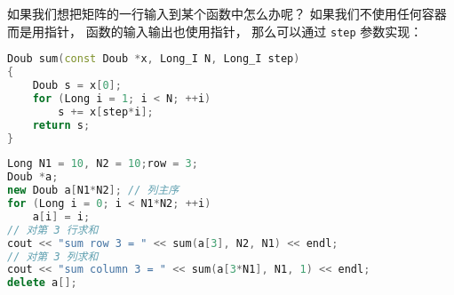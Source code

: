 
如果我们想把矩阵的一行输入到某个函数中怎么办呢？ 如果我们不使用任何容器而是用指针， 函数的输入输出也使用指针， 那么可以通过 \verb|step| 参数实现：
\begin{lstlisting}[language=cpp]
Doub sum(const Doub *x, Long_I N, Long_I step)
{
    Doub s = x[0];
    for (Long i = 1; i < N; ++i)
        s += x[step*i];
    return s;
}
\end{lstlisting}

\begin{lstlisting}[language=cpp]
Long N1 = 10, N2 = 10;row = 3;
Doub *a;
new Doub a[N1*N2]; // 列主序
for (Long i = 0; i < N1*N2; ++i)
    a[i] = i;
// 对第 3 行求和
cout << "sum row 3 = " << sum(a[3], N2, N1) << endl;
// 对第 3 列求和
cout << "sum column 3 = " << sum(a[3*N1], N1, 1) << endl;
delete a[];
\end{lstlisting}
